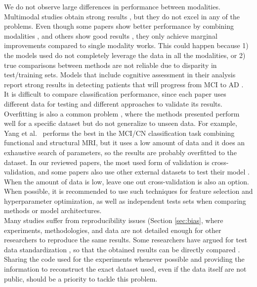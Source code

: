 We do not observe large differences in performance between modalities. Multimodal studies obtain strong results \cite{Chen2015,Hinrichs2011,Minhas2016,Minhas2018}, but they do not excel in any of the problems. Even though some papers show better performance by combining modalities \cite{Hinrichs2011}, and others show good results \cite{Ardekani2016,Chi2017,Minhas2016,Minhas2018}, they only achieve marginal improvements compared to single modality works. This could happen because 1) the models used do not completely leverage the data in all the modalities, or 2) true comparisons between methods are not reliable due to disparity in test/training sets. Models that include cognitive assessment in their analysis report strong results in detecting patients that will progress from MCI to AD \cite{Chen2015,Thung2018,Aghili2018,Minhas2016,Minhas2018,Ardekani2016,Mubeen2017}. \\


It is difficult to compare classification performance, since each paper uses different data for testing and different approaches to validate its results. Overfitting is also a common problem \cite{cuingnet,Mendelson2017}, where the methods presented perform well for a specific dataset but do not generalize to unseen data. For example, Yang et al.\ \cite{Yang2018} performs the best in the MCI/CN classification task combining functional and structural MRI, but it uses a low amount of data and it does an exhaustive search of parameters, so the results are probably overfitted to the dataset. In our reviewed papers, the most used form of validation is cross-validation, and some papers also use other external datasets to test their model \cite{Aksman2016,Platero2019}. When the amount of data is low, leave one out cross-validation is also an option. When possible, it is recommended to use such techniques for feature selection and hyperparameter optimization, as well as independent tests sets when comparing methods or model architectures. \\

Many studies suffer from reproducibility issues (Section \ref{sec:bias}, where experiments, methodologies, and data are not detailed enough for other researchers to reproduce the same results. Some researchers have argued for test data standardization \cite{cuingnet,Samper-Gonzalez2018,Wyman2013}, so that the obtained results can be directly compared \cite{Minhas2016,Minhas2018,Sanroma2017}. Sharing the code used for the experiments whenever possible and providing the information to reconstruct the exact dataset used, even if the data itself are not public, should be a priority to tackle this problem. \\

